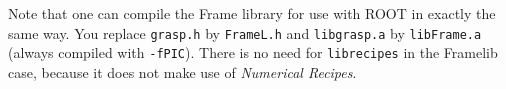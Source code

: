 Note that one can compile the Frame library for use with ROOT in exactly the
same way.  You replace {\tt grasp.h} by {\tt FrameL.h} and {\tt libgrasp.a} by {\tt libFrame.a}
(always compiled with {\tt -fPIC}). There is no need for {\tt librecipes} in the
Framelib case, because it does not make use of {\it Numerical Recipes}.
\clearpage



